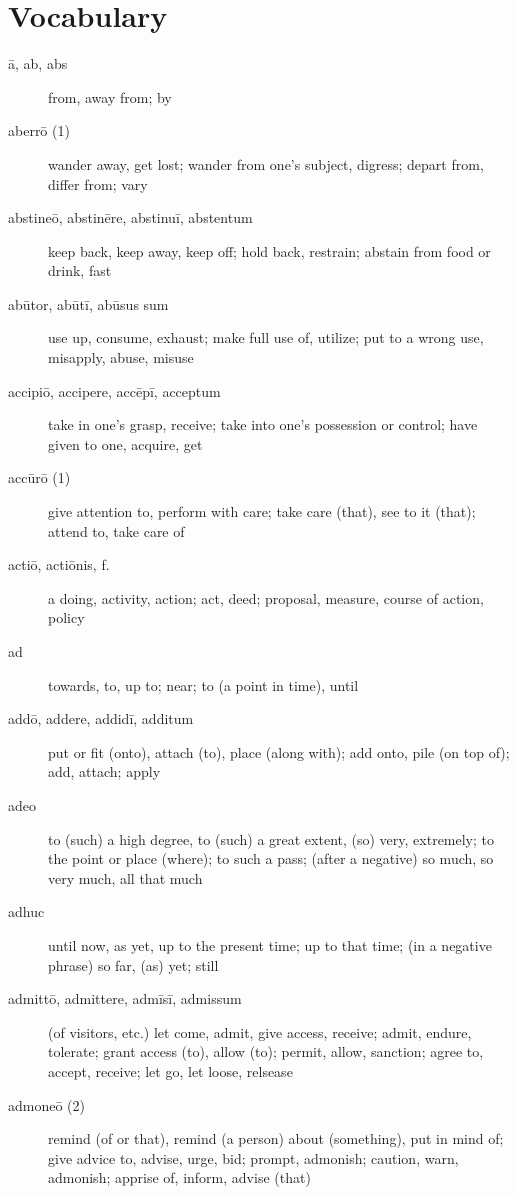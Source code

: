 \chapter{Vocabulary}

\begin{description}
    \item[ā, ab, abs] from, away from; by
    \item[aberrō (1)] wander away, get lost; wander from one's subject, digress; depart from, differ from; vary
    \item[abstineō, abstinēre, abstinuī, abstentum] keep back, keep away, keep off; hold back, restrain; abstain from food or drink, fast
    \item[abūtor, abūtī, abūsus sum]  use up, consume, exhaust; make full use of, utilize; put to a wrong use, misapply, abuse, misuse
    \item[accipiō, accipere, accēpī, acceptum] take in one's grasp, receive; take into one's possession or control; have given to one, acquire, get
    \item[accūrō (1)] give attention to, perform with care; take care (that), see to it (that); attend to, take care of
    \item[actiō, actiōnis, f.] a doing, activity, action; act, deed; proposal, measure, course of action, policy
    \item[ad] towards, to, up to; near; to (a point in time), until
    \item[addō, addere, addidī, additum] put or fit (onto), attach (to), place (along with); add onto, pile (on top of); add, attach; apply
    \item[adeo]  to (such) a high degree, to (such) a great extent, (so) very, extremely; to the point or place (where); to such a pass; (after a negative) so much, so very much, all that much
    \item[adhuc]  until now, as yet, up to the present time; up to that time; (in a negative phrase) so far, (as) yet; still
    \item[admittō, admittere, admīsī, admissum] (of visitors, etc.) let come, admit, give access, receive; admit, endure, tolerate; grant access (to), allow (to); permit, allow, sanction; agree to, accept, receive; let go, let loose, relsease
    \item[admoneō (2)] remind (of or that), remind (a person) about (something), put in mind of; give advice to, advise, urge, bid; prompt, admonish; caution, warn, admonish; apprise of, inform, advise (that)

\end{description}
